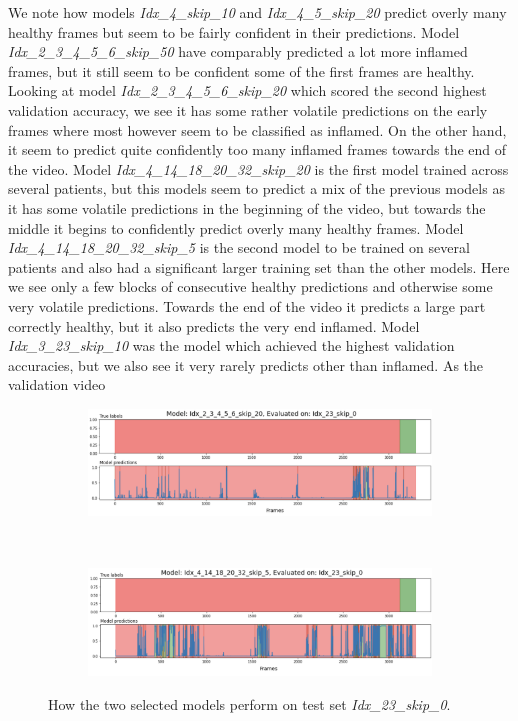 We note how models \textit{Idx\_4\_skip\_10} and \textit{Idx\_4\_5\_skip\_20} predict overly many healthy frames but seem to be fairly confident in their predictions. Model \textit{Idx\_2\_3\_4\_5\_6\_skip\_50} have comparably predicted a lot more inflamed frames, but it still seem to be confident some of the first frames are healthy. Looking at model \textit{Idx\_2\_3\_4\_5\_6\_skip\_20} which scored the second highest validation accuracy, we see it has some rather volatile predictions on the early frames where most however seem to be classified as inflamed. On the other hand, it seem to predict quite confidently too many inflamed frames towards the end of the video. Model \textit{Idx\_4\_14\_18\_20\_32\_skip\_20} is the first model trained across several patients, but this models seem to predict a mix of the previous models as it has some volatile predictions in the beginning of the video, but towards the middle it begins to confidently predict overly many healthy frames. Model \textit{Idx\_4\_14\_18\_20\_32\_skip\_5} is the second model to be trained on several patients and also had a significant larger training set than the other models. Here we see only a few blocks of consecutive healthy predictions and otherwise some very volatile predictions. Towards the end of the video it predicts a large part correctly healthy, but it also predicts the very end inflamed. Model \textit{Idx\_3\_23\_skip\_10} was the model which achieved the highest validation accuracies, but we also see it very rarely predicts other than inflamed. As the validation video

\begin{figure}[H]
	\centering
	\begin{subfigure}{\linewidth}
		\centering
		\includegraphics[width=\linewidth]{Materials/Results/SP/M4On23C}
	\end{subfigure}
	\\
	\begin{subfigure}{\linewidth}
		\centering
		\includegraphics[width=\linewidth]{Materials/Results/SP/M6On23C}
	\end{subfigure}
	\caption{How the two selected models perform on test set \textit{Idx\_23\_skip\_0}.}
	\label{idx23}
\end{figure}

